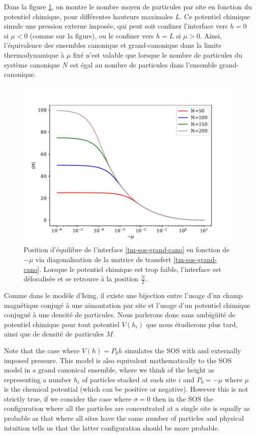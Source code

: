 Dans la figure \ref{hauteur-mu}, on montre le nombre moyen de particules par site en fonction du potentiel chimique, pour différentes hauteurs maximales $L$. Ce potentiel chimique simule une pression externe imposée, qui peut soit confiner l'interface vers $h=0$ si $\mu \less 0$ (comme sur la figure), ou le confiner vers $h=L$ si $\mu \greater 0$. 
Ainsi, l'équivalence des ensembles canonique et grand-canonique dans la limite thermodynamique à $\mu$ fixé n'est valable que lorsque le nombre de particules du système canonique $N$ est égal au nombre de particules dans l'ensemble grand-canonique.
\begin{figure}
    \centering
	\includegraphics[width=0.7\linewidth]{int-dyn/hauteur-tm-sos.pdf}
	\caption{Position d'équilibre de l'interface \ref{tm-sos-grand-cano} en fonction de $- \mu$ via diagonalisation de la matrice de transfert \ref{tm-sos-grand-cano}. Lorsque le potentiel chimique est trop faible, l'interface est délocalisée et se retrouve à la position $\frac{N}{2}$. }
	\label{hauteur-mu}
\end{figure}

Comme dans le modèle d'Ising, il existe une bijection entre l'usage d'un champ magnétique conjugé à une aimantation par site et l'usage d'un potentiel chimique conjugué à une densité de particules. Nous parlerons donc sans ambigüité de potentiel chimique pour tout potentiel $V(h_i)$ que nous étudierons plus tard, ainsi que de densité de particules $M$.


Note that the case where $V(h)=P_0h$ simulates the SOS with and externally imposed pressure. This model is also equivalent mathematically to the SOS model in a grand canonical ensemble, where we think of the height as representing a number $h_i$ of particles stacked at each site $i$ and $P_0=-\mu$ where $\mu$ is the chemical potential (which can be positive or negative). However this is not strictly true, if we consider the case where $\sigma=0$ then in the SOS the configuration where all the particles are concentrated at a single site is equally as probable as that where all sites have the same number of particles and physical intuition tells us that the latter configuration should be more probable.

